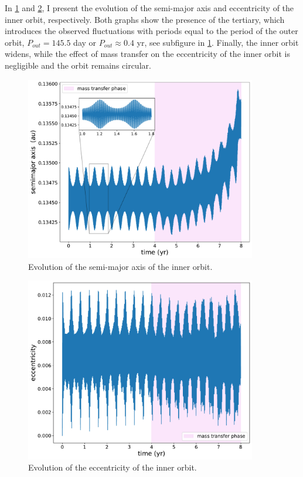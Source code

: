 In \cref{fig:accretion_inc_00_inner_semimajor_axis} and \cref{fig:accretion_inc_00_inner_ecc}, I present the evolution of the semi-major axis and eccentricity of the inner orbit, 
respectively. Both graphs show the presence of the tertiary, which introduces the observed fluctuations with periods equal to the period of the outer orbit, $P_{out} = 145.5$ day or $P_{out} \approx 0.4$ yr, see subfigure in \cref{fig:accretion_inc_00_inner_semimajor_axis}. Finally, the inner orbit widens, while the effect of mass transfer on the eccentricity of the inner orbit is negligible and the orbit remains circular.
\begin{figure}[H]
    \centering
    \includegraphics[width=0.9\textwidth]{Thesis/graphs/inc_00/accretion_inc_00_inner_semimajor_axis.pdf}
    \caption{Evolution of the semi-major axis of the inner orbit.}
    \label{fig:accretion_inc_00_inner_semimajor_axis}
\end{figure}
\begin{figure}[!htb]
    \centering
    \includegraphics[width=0.9\textwidth]{Thesis/graphs/inc_00/accretion_inc_00_inner_ecc.pdf}
    \caption{Evolution of the eccentricity of the inner orbit.}
    \label{fig:accretion_inc_00_inner_ecc}
\end{figure}

